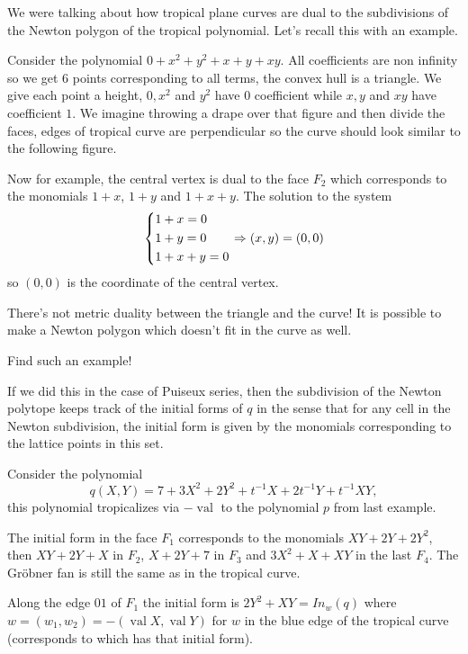 \documentclass[12pt]{memoir}
\DeclareMathOperator{\val}{val}
\theoremstyle{definition}
\begin{document}
We were talking about how tropical plane curves are dual to the subdivisions of the Newton polygon of the tropical polynomial. Let's recall this with an example. 

\begin{Ex}
    Consider the polynomial $0+x^2+y^2+x+y+xy$. All coefficients are non infinity so we get 6 points corresponding to all terms, the convex hull is a triangle. We give each point a height, $0,x^2$ and $y^2$ have $0$ coefficient while $x,y$ and $xy$ have coefficient $1$. We imagine throwing a drape over that figure and then divide the faces, edges of tropical curve are perpendicular so the curve should look similar to the following figure.\par
    \par 
    Now for example, the central vertex is dual to the face $F_2$ which corresponds to the monomials $1+x$, $1+y$ and $1+x+y$. The solution to the system 
    $$
    \left\lbrace
    \begin{aligned}
        &1+x=0\\
        &1+y=0\\
        &1+x+y=0\\
    \end{aligned}
    \right.
    \Rightarrow (x,y)=(0,0)
    $$
    so $(0,0)$ is the coordinate of the central vertex.
\end{Ex}

\begin{Rmk}
There's not metric duality between the triangle and the curve! It is possible to make a Newton polygon which doesn't fit in the curve as well.
\end{Rmk}

\begin{Ej}[5]
Find such an example!
\end{Ej}

If we did this in the case of Puiseux series, then the subdivision of the Newton polytope keeps track of the initial forms of $q$ in the sense that for any cell in the Newton subdivision, the initial form is given by the monomials corresponding to the lattice points in this set.

\begin{Ex}
    Consider the polynomial 
    $$q(X,Y)=7+3X^2+2Y^2+t^{-1}X+2t^{-1}Y+t^{-1}XY,$$
    this polynomial tropicalizes via $-\val$ to the polynomial $p$ from last example.\par {}\par 
    The initial form in the face $F_1$ corresponds to the monomials $XY+2Y+2Y^2$, then $XY+2Y+X$ in $F_2$, $X+2Y+7$ in $F_3$ and $3X^2+X+XY$ in the last $F_4$. The Gr\"obner fan is still the same as in the tropical curve.\par 
    Along the edge $01$ of $F_1$ the initial form is $2Y^2+XY=In_w(q)$ where $w=(w_1,w_2)=-(\val X,\val Y)$ for $w$ in the blue edge of the tropical curve (corresponds to  which has that initial form). 
\end{Ex}
\end{document}
